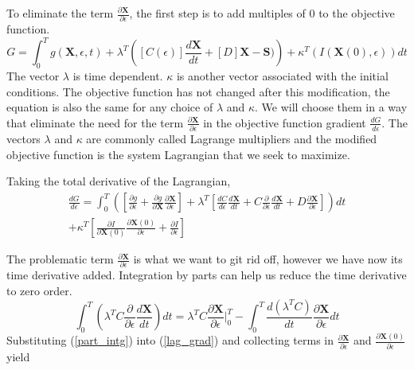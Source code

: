 \documentclass{tufte-handout}
\begin{document}
 To eliminate the term $ \frac{\partial \mathbf{X}}{\partial \epsilon}$, the first step is to  add  multiples of $0$ to the objective function.
 \begin{equation}
G =  \int^T_0 g(\mathbf{X},\epsilon,t)   + \lambda^T \left( [C(\epsilon)] \frac{d \mathbf{X}}{dt} + [D] \mathbf{X} - \mathbf{S}) \right) + \kappa^T\left( I(\mathbf{X}(0),\epsilon) \right) dt
 \end{equation}
 The vector  $\lambda$  is time dependent. $\kappa$  is another vector associated with the initial conditions.   The objective function has not changed after this modification, the equation is also the same  for any choice of $\lambda$ and $\kappa$. We will choose them in a way that eliminate the need for  the term   $ \frac{\partial \mathbf{X}}{\partial \epsilon}$ in the objective function gradient $\frac{dG}{d\epsilon}$. The vectors $\lambda$ and $\kappa$ are commonly called Lagrange multipliers and the modified objective function is the system Lagrangian that we seek to maximize. 
 
 Taking the total derivative of the Lagrangian,
 \begin{multline}\label{lag_grad}
\frac{d G}{d\epsilon} = \int_{0}^{T}\left( \left[  \frac{\partial g}{\partial \epsilon} +  \frac{\partial g}{\partial \mathbf{X}} \frac{\partial \mathbf{X}}{\partial \epsilon}\right] +  \lambda^T\left[ \frac{d C}{d \epsilon} \frac{d \mathbf{X}}{dt} + C \frac{\partial}{\partial \epsilon} \frac{d \mathbf{X}}{dt} + D \frac{\partial \mathbf{X}}{\partial \epsilon} \right]  \right) dt \\ +  \kappa^T  \left[ \frac{\partial I}{\partial \mathbf{X}(0)}  \frac{\partial \mathbf{X}(0)}{\partial \epsilon} + \frac{\partial I}{\partial \epsilon} \right] 
 \end{multline}

The problematic term  $\frac{\partial \mathbf{X}}{\partial \epsilon}$  is what we want to git rid off, however we have now its time derivative added. Integration by parts can help us reduce the time derivative to zero order.  
\begin{equation}\label{part_intg}
 \int_{0}^{T} \left(  \lambda^T C \frac{\partial}{\partial \epsilon}   \frac{d \mathbf{X}}{dt} \right) dt = \lambda^T C \frac{\partial \mathbf{X}}{\partial \epsilon}|^T_0 - \int_{0}^{T}
   \frac{ d\left(  \lambda^T C \right) }{dt} \frac{\partial \mathbf{X}}{\partial \epsilon} dt
\end{equation}
Substituting (\ref*{part_intg}) into (\ref*{lag_grad}) and collecting terms  in $\frac{\partial \mathbf{X}}{\partial \epsilon}$ and  $\frac{\partial \mathbf{X}(0)}{\partial \epsilon}$ yield
\end{document}
